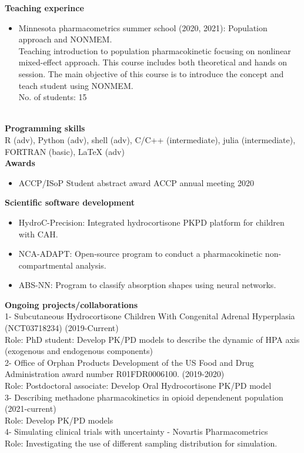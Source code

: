 \documentclass[a4paper,11pt]{article}
\begin{document}
\textbf{Teaching experince} \\
\begin{itemize}
\item Minnesota pharmacometrics summer school (2020, 2021): Population approach and NONMEM.
~\\
Teaching introduction to population pharmacokinetic focusing on nonlinear mixed-effect approach. This course includes both theoretical and hands on session. The main objective of this course is to introduce the concept and teach student using NONMEM. 
~\\ 
No. of students: 15    
\end{itemize}
~\\
\textbf{Programming skills}\\
R (adv), Python (adv), shell (adv), C/C++ (intermediate), julia (intermediate), FORTRAN (basic), LaTeX (adv)\\
\textbf{Awards} \\

\begin{itemize}
\item ACCP/ISoP Student abstract award \hfill ACCP annual meeting 2020
\end{itemize}

\textbf{Scientific software development} \\
\begin{itemize}
\item HydroC-Precision: Integrated hydrocortisone PKPD platform for children with CAH.
\item NCA-ADAPT: Open-source program to conduct a pharmacokinetic non-compartmental analysis. 
\item ABS-NN: Program to classify absorption shapes using neural networks. 
\end{itemize}

\textbf{Ongoing projects/collaborations}\\
1- Subcutaneous Hydrocortisone Children With Congenital Adrenal Hyperplasia (NCT03718234) (2019-Current)
~\\
Role: PhD student: Develop PK/PD models to describe the dynamic of HPA axis (exogenous and endogenous components)
~\\
2- Office of Orphan Products Development of the US Food and Drug Administration award number R01FDR0006100. (2019-2020)
~\\
Role: Postdoctoral associate: Develop Oral Hydrocortisone PK/PD model
~\\
3- Describing methadone pharmacokinetics in opioid dependenent population (2021-current)
~\\
Role: Develop PK/PD models 
~\\
4- Simulating clinical trials with uncertainty - Novartis Pharmacometrics 
~\\
Role: Investigating the use of different sampling distribution for simulation. 
~\\
\nocite{*}
\printbibliography[title=Publications, keyword=papers]
\end{document}
